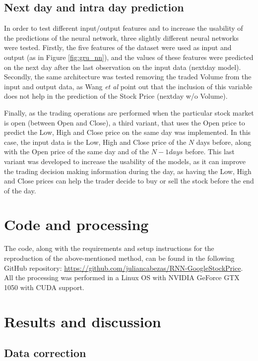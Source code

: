 \documentclass[10pt,twocolumn,letterpaper]{article}
\begin{document}
\subsection{Next day and intra day prediction}

In order to test different input/output features and to increase the usability of the predictions of the neural network, three slightly different neural networks were tested. Firstly, the five features of the dataset were used as input and output (as in Figure \ref{fig:gru_nn}), and the values of these features were predicted on the next day after the last observation on the input data (nextday model). Secondly, the same architecture was tested removing the traded Volume from the input and output data, as Wang \textit{et al} \cite{Wang2003} point out that the inclusion of this variable does not help in the prediction of the Stock Price (nextday w/o Volume). 

Finally, as the trading operations are performed when the particular stock market is open (between Open and Close), a third variant, that uses the Open price to predict the Low, High and Close price on the same day was implemented. In this case, the input data is the Low, High and Close price of the $N$ days before, along with the Open price of the same day and of the $N-1 days$ before. This last variant was developed to increase the usability of the models, as it can improve the trading decision making information during the day, as having the Low, High and Close prices can help the trader decide to buy or sell the stock before the end of the day.


\section{Code and processing}

The code, along with the requirements and setup instructions for the reproduction of the above-mentioned method, can be found in the following GitHub repository: \url{https://github.com/juliancabezas/RNN-GoogleStockPrice}. All the processing was performed in a Linux OS with NVIDIA GeForce GTX 1050 with CUDA support.

\section{Results and discussion}

\subsection{Data correction}
\end{document}

